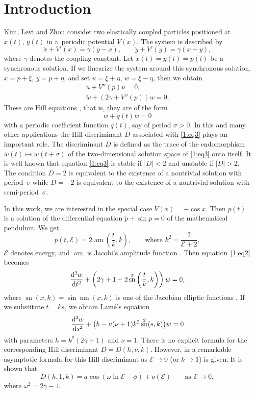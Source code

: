 \documentclass[pdftex]{sigma}
\newcommand{\E}{\mathcal{E}}
\DeclareMathOperator{\am}{am}
\DeclareMathOperator{\sn}{sn}
\numberwithin{equation}{section}
\begin{document}
\renewcommand{\thefootnote}{\arabic{footnote}}
\setcounter{footnote}{0}

\section{Introduction}%

Kim, Levi and Zhou \cite{Kim} consider two elastically coupled particles positioned at $x(t)$, $y(t)$ in a~periodic potential $V(x)$.
The system is described by
\[ \ddot{x}+V'(x)=\gamma (y-x),\qquad \ddot{y}+V'(y)=\gamma(x-y),\]
where $\gamma$ denotes the coupling constant.
Let $x(t)=y(t)=p(t)$ be a synchronous solution. If we linearize the system around
this synchronous solution, $x=p+\xi$, $y=p+\eta$, and set $u=\xi+\eta$, $w=\xi-\eta$, then we obtain
\begin{gather}
 \ddot{u}+V''(p)u=0,\nonumber\\%
 \ddot{w}+(2\gamma+V''(p))w=0 .\label{1:eq2}
\end{gather}
These are Hill equations \cite{MW}, that is, they are of the form
\begin{equation}\label{1:eq3}
\ddot w+ q(t) w =0
\end{equation}
with a periodic coefficient function $q(t)$, say of period $\sigma>0$.
In this and many other applications the Hill discriminant $D$ associated with \eqref{1:eq3} plays an important role.
The discriminant $D$ is defined as the trace of the endomorphism $w(t)\mapsto w(t+\sigma)$ of the two-dimensional solution space of
\eqref{1:eq3} onto itself.
It is well known \cite{MW} that equation \eqref{1:eq3} is stable if $|D|<2$ and unstable if $|D|>2$. The condition $D=2$ is equivalent to
the existence of a nontrivial solution with period~$\sigma$ while $D=-2$ is equivalent to
the existence of a nontrivial solution with semi-period~$\sigma$.

In this work, we are interested in the special case $V(x)=-\cos x$. Then $p(t)$ is a solution of the differential equation $\ddot{p}+\sin p=0$ of the mathematical pendulum.
We get \cite[Section~22.19\,(i)]{dlmf}
\[
 p(t,\E)=2\am\left(\frac{t}{k},k\right),\qquad\text{where $k^2=\frac{2}{\E+2}$},
 \]
$\E$ denotes energy, and $\am$ is Jacobi's amplitude function \cite[Section~22.16\,(i)]{dlmf}.
Then equation~\eqref{1:eq2} becomes
\[
\frac{{\rm d}^2w}{{\rm d}t^2}+\left(2\gamma+1-2\sn^2\left(\frac{t}{k},k\right)\right) w=0,
\]
where $\sn(x,k)=\sin \am(x,k)$ is one of the Jacobian elliptic functions \cite[Section~16]{dlmf}.
If we substitute $t=ks$, we obtain Lam\'e's equation \cite[Section~29]{dlmf}
\begin{equation}\label{1:Lame}
\frac{{\rm d}^2w}{{\rm d}s^2} +\bigl(h-\nu(\nu+1)k^2\sn^2(s,k)\bigr) w=0
\end{equation}
with parameters $h=k^2(2\gamma+1)$ and $\nu=1$.
There is no explicit formula for the corresponding Hill discriminant
$D=D(h,\nu,k)$.
However, in \cite{Kim} a remarkable asymptotic formula for this Hill discriminant as $\E\to 0$ (or $k\to1$) is given.
It is shown that
\begin{equation}\label{1:eq4}
 D(h,1,k)=a\cos\left(\omega\ln \E-\phi\right)+o(\E) \qquad\text{as $\E\to 0$},
\end{equation}
where $\omega^2=2\gamma-1$.
\end{document}
